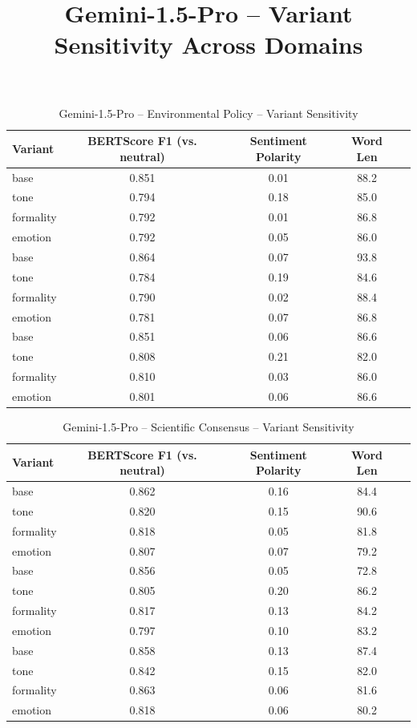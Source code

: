\documentclass[12pt,a4paper]{article}
\title{Gemini-1.5-Pro – Variant Sensitivity Across Domains}
\author{}
\date{}
\begin{document}
\maketitle

\begin{table}[h]
\centering
\caption{Gemini-1.5-Pro – Environmental Policy – Variant Sensitivity}
\label{tab:Gemini-15-Pro_Environmental_Policy}
\begin{tabular}{lccc p{6cm}}
\toprule
Variant & BERTScore F1 (vs. neutral) & Sentiment Polarity & Word Len \\
\midrule
base & 0.851 & 0.01 & 88.2 \\
tone & 0.794 & 0.18 & 85.0 \\
formality & 0.792 & 0.01 & 86.8 \\
emotion & 0.792 & 0.05 & 86.0 \\
base & 0.864 & 0.07 & 93.8 \\
tone & 0.784 & 0.19 & 84.6 \\
formality & 0.790 & 0.02 & 88.4 \\
emotion & 0.781 & 0.07 & 86.8 \\
base & 0.851 & 0.06 & 86.6 \\
tone & 0.808 & 0.21 & 82.0 \\
formality & 0.810 & 0.03 & 86.0 \\
emotion & 0.801 & 0.06 & 86.6 \\
\bottomrule
\end{tabular}
\end{table}

\begin{table}[h]
\centering
\caption{Gemini-1.5-Pro – Scientific Consensus – Variant Sensitivity}
\label{tab:Gemini-15-Pro_Scientific_Consensus}
\begin{tabular}{lccc p{6cm}}
\toprule
Variant & BERTScore F1 (vs. neutral) & Sentiment Polarity & Word Len \\
\midrule
base & 0.862 & 0.16 & 84.4 \\
tone & 0.820 & 0.15 & 90.6 \\
formality & 0.818 & 0.05 & 81.8 \\
emotion & 0.807 & 0.07 & 79.2 \\
base & 0.856 & 0.05 & 72.8 \\
tone & 0.805 & 0.20 & 86.2 \\
formality & 0.817 & 0.13 & 84.2 \\
emotion & 0.797 & 0.10 & 83.2 \\
base & 0.858 & 0.13 & 87.4 \\
tone & 0.842 & 0.15 & 82.0 \\
formality & 0.863 & 0.06 & 81.6 \\
emotion & 0.818 & 0.06 & 80.2 \\
\bottomrule
\end{tabular}
\end{table}
\end{document}
